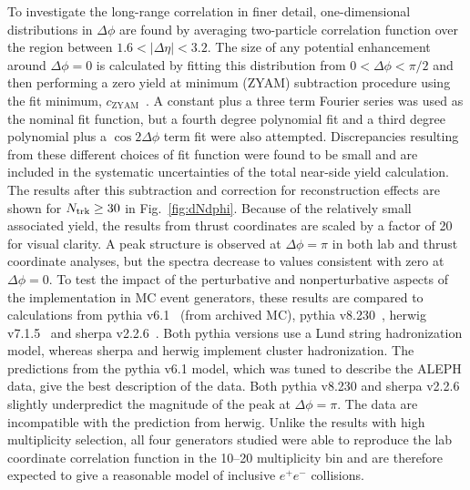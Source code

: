 \documentclass[aps,prl,twocolumn,superscriptaddress,groupedaddress]{revtex4}  %
\begin{document}
To investigate the long-range correlation in finer detail, one-dimensional distributions in $\Delta\phi$ are found by averaging two-particle correlation function over the region between $1.6 < |\Delta\eta| < 3.2$.  The size of any potential enhancement around $\Delta\phi = 0$ is calculated by fitting this distribution from $0 < \Delta\phi < \pi/2$ and then performing a zero yield at minimum (ZYAM) subtraction procedure using the fit minimum, $c_{\text{ZYAM}}$~\cite{Ajitanand:2005jj}. A constant plus a three term Fourier series was used as the nominal fit function, but a fourth degree polynomial fit and a third degree polynomial plus a $\cos{2\Delta\phi}$ term fit were also attempted.  Discrepancies resulting from these different choices of fit function were found to be small and are included in the systematic uncertainties of the total near-side yield calculation. The results after this subtraction and correction for reconstruction effects are shown for $N_{\rm trk} \geq 30$ in Fig.~\ref{fig:dNdphi}. Because of the relatively small associated yield, the results from thrust coordinates are scaled by a factor of 20 for visual clarity.
A peak structure is observed at $\Delta\phi = \pi$ in both lab and thrust coordinate analyses, but the spectra decrease to values consistent with zero at $\Delta\phi = 0$. 
To test the impact of the perturbative and nonperturbative aspects of the implementation in MC event generators, these results are compared to calculations from {\sc pythia} v6.1~\cite{Sjostrand:2000wi} (from archived MC), {\sc pythia} v8.230~\cite{Sjostrand:2014zea}, {\sc herwig} v7.1.5~\cite{Bellm:2015jjp,Reichelt:2017hts} and {\sc sherpa} v2.2.6~\cite{Gleisberg:2008ta}. Both {\sc pythia} versions use a Lund string hadronization model, whereas {\sc sherpa} and {\sc herwig} implement cluster hadronization. The predictions from the {\sc pythia} v6.1 model, which was tuned to describe the ALEPH data, give the best description of the data. Both {\sc pythia} v8.230 and {\sc sherpa} v2.2.6 slightly underpredict the magnitude of the peak at $\Delta\phi = \pi$. The data are incompatible with the prediction from {\sc herwig}. Unlike the results with high multiplicity selection, all four generators studied were able to reproduce the lab coordinate correlation function in the 10--20 multiplicity bin and are therefore expected to give a reasonable model of inclusive $e^{+}e^{-}$ collisions.
\end{document}
